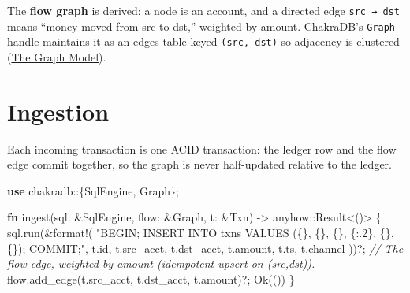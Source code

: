 \documentclass[
  11pt,
  openany]{book}
\newenvironment{Shaded}{}{}
\newcommand{\CommentTok}[1]{\textcolor[rgb]{0.38,0.63,0.69}{\textit{#1}}}
\newcommand{\ConstantTok}[1]{\textcolor[rgb]{0.53,0.00,0.00}{#1}}
\newcommand{\DataTypeTok}[1]{\textcolor[rgb]{0.56,0.13,0.00}{#1}}
\newcommand{\KeywordTok}[1]{\textcolor[rgb]{0.00,0.44,0.13}{\textbf{#1}}}
\newcommand{\NormalTok}[1]{#1}
\newcommand{\OperatorTok}[1]{\textcolor[rgb]{0.40,0.40,0.40}{#1}}
\newcommand{\PreprocessorTok}[1]{\textcolor[rgb]{0.74,0.48,0.00}{#1}}
\newcommand{\StringTok}[1]{\textcolor[rgb]{0.25,0.44,0.63}{#1}}
\begin{document}
The \textbf{flow graph} is derived: a node is an account, and a directed
edge \texttt{src\ →\ dst} means ``money moved from src to dst,''
weighted by amount. ChakraDB's \texttt{Graph} handle maintains it as an
edges table keyed \texttt{(src,\ dst)} so adjacency is clustered
(\href{../graph/model.md}{The Graph Model}).

\section{Ingestion}\label{ingestion}

Each incoming transaction is one ACID transaction: the ledger row and
the flow edge commit together, so the graph is never half-updated
relative to the ledger.

\begin{Shaded}
\begin{Highlighting}[]
\KeywordTok{use} \PreprocessorTok{chakradb::}\OperatorTok{\{}\NormalTok{SqlEngine}\OperatorTok{,}\NormalTok{ Graph}\OperatorTok{\};}

\KeywordTok{fn}\NormalTok{ ingest(sql}\OperatorTok{:} \OperatorTok{\&}\NormalTok{SqlEngine}\OperatorTok{,}\NormalTok{ flow}\OperatorTok{:} \OperatorTok{\&}\NormalTok{Graph}\OperatorTok{,}\NormalTok{ t}\OperatorTok{:} \OperatorTok{\&}\NormalTok{Txn) }\OperatorTok{{-}\textgreater{}} \PreprocessorTok{anyhow::}\DataTypeTok{Result}\OperatorTok{\textless{}}\NormalTok{()}\OperatorTok{\textgreater{}} \OperatorTok{\{}
\NormalTok{    sql}\OperatorTok{.}\NormalTok{run(}\OperatorTok{\&}\PreprocessorTok{format!}\NormalTok{(}
        \StringTok{"BEGIN;}
\StringTok{         INSERT INTO txns VALUES (\{\}, \{\}, \{\}, \{:.2\}, \textquotesingle{}\{\}\textquotesingle{}, \textquotesingle{}\{\}\textquotesingle{});}
\StringTok{         COMMIT;"}\OperatorTok{,}
\NormalTok{        t}\OperatorTok{.}\NormalTok{id}\OperatorTok{,}\NormalTok{ t}\OperatorTok{.}\NormalTok{src\_acct}\OperatorTok{,}\NormalTok{ t}\OperatorTok{.}\NormalTok{dst\_acct}\OperatorTok{,}\NormalTok{ t}\OperatorTok{.}\NormalTok{amount}\OperatorTok{,}\NormalTok{ t}\OperatorTok{.}\NormalTok{ts}\OperatorTok{,}\NormalTok{ t}\OperatorTok{.}\NormalTok{channel}
\NormalTok{    ))}\OperatorTok{?;}
    \CommentTok{// The flow edge, weighted by amount (idempotent upsert on (src,dst)).}
\NormalTok{    flow}\OperatorTok{.}\NormalTok{add\_edge(t}\OperatorTok{.}\NormalTok{src\_acct}\OperatorTok{,}\NormalTok{ t}\OperatorTok{.}\NormalTok{dst\_acct}\OperatorTok{,}\NormalTok{ t}\OperatorTok{.}\NormalTok{amount)}\OperatorTok{?;}
    \ConstantTok{Ok}\NormalTok{(())}
\OperatorTok{\}}
\end{Highlighting}
\end{Shaded}
\end{document}
